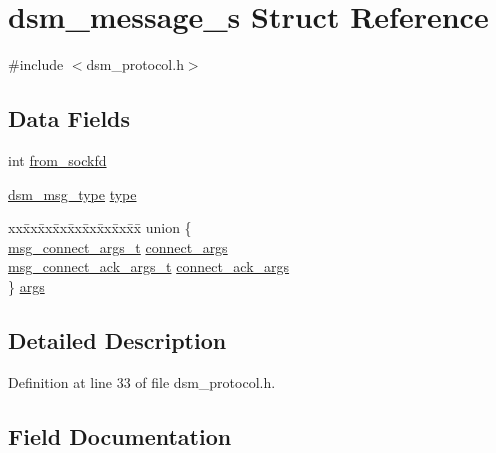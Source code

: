 \hypertarget{structdsm__message__s}{}\section{dsm\+\_\+message\+\_\+s Struct Reference}
\label{structdsm__message__s}


{\ttfamily \#include $<$dsm\+\_\+protocol.\+h$>$}

\subsection*{Data Fields}
\begin{DoxyCompactItemize}
\item 
int \hyperlink{structdsm__message__s_a0b678035441fab5d8d8f27b1efb66fd3}{from\+\_\+sockfd}
\item 
\hyperlink{dsm__protocol_8h_a19505c06a6c9d61ed11250fd954454ef}{dsm\+\_\+msg\+\_\+type} \hyperlink{structdsm__message__s_a14b6c37fbb5fc6cb767b380c417830bd}{type}
\item 
\begin{tabbing}
xx\=xx\=xx\=xx\=xx\=xx\=xx\=xx\=xx\=\kill
union \{\\
\>\hyperlink{dsm__protocol_8h_a4359196bd42acc7884ebc36b7375d490}{msg\_connect\_args\_t} \hyperlink{structdsm__message__s_af9c2f68620cc20727f6f36ce717f0cb5}{connect\_args}\\
\>\hyperlink{dsm__protocol_8h_a1ac3fc415939f27283eb5d75ba872df0}{msg\_connect\_ack\_args\_t} \hyperlink{structdsm__message__s_aa07907cbd5e988af59259e86629c1651}{connect\_ack\_args}\\
\} \hyperlink{structdsm__message__s_ae9852bec3ebde772b633feebebf9f8d8}{args}\\

\end{tabbing}\end{DoxyCompactItemize}


\subsection{Detailed Description}


Definition at line 33 of file dsm\+\_\+protocol.\+h.



\subsection{Field Documentation}
